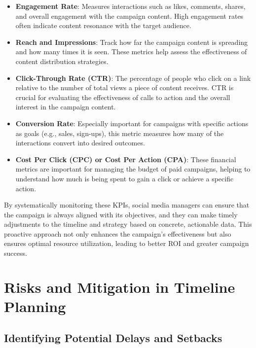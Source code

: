 \documentclass[
]{book}
\begin{document}
\begin{itemize}
\item
  \textbf{Engagement Rate}: Measures interactions such as likes, comments, shares, and overall engagement with the campaign content. High engagement rates often indicate content resonance with the target audience.
\item
  \textbf{Reach and Impressions}: Track how far the campaign content is spreading and how many times it is seen. These metrics help assess the effectiveness of content distribution strategies.
\item
  \textbf{Click-Through Rate (CTR)}: The percentage of people who click on a link relative to the number of total views a piece of content receives. CTR is crucial for evaluating the effectiveness of calls to action and the overall interest in the campaign content.
\item
  \textbf{Conversion Rate}: Especially important for campaigns with specific actions as goals (e.g., sales, sign-ups), this metric measures how many of the interactions convert into desired outcomes.
\item
  \textbf{Cost Per Click (CPC) or Cost Per Action (CPA)}: These financial metrics are important for managing the budget of paid campaigns, helping to understand how much is being spent to gain a click or achieve a specific action.
\end{itemize}

By systematically monitoring these KPIs, social media managers can ensure that the campaign is always aligned with its objectives, and they can make timely adjustments to the timeline and strategy based on concrete, actionable data. This proactive approach not only enhances the campaign's effectiveness but also ensures optimal resource utilization, leading to better ROI and greater campaign success.

\hypertarget{risks-and-mitigation-in-timeline-planning}{%
\section{Risks and Mitigation in Timeline Planning}\label{risks-and-mitigation-in-timeline-planning}}

\hypertarget{identifying-potential-delays-and-setbacks}{%
\subsection*{Identifying Potential Delays and Setbacks}\label{identifying-potential-delays-and-setbacks}}
\end{document}
